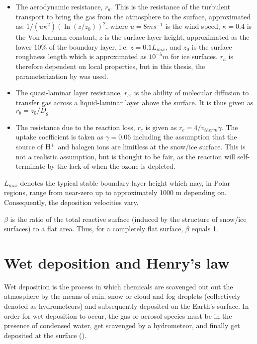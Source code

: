 \begin{itemize}
    \item The aerodynamic resistance, $r_a$. This is the resistance of the turbulent transport to bring the gas from the atmosphere to the surface, approximated as: $1/(u\kappa^2)(\ln(z/z_0))^2$, where $u = 8 ms^{-1}$ is the wind speed, $\kappa = 0.4$ is the Von Karman constant, $z$ is the surface layer height, approximated as the lower $10\%$ of the boundary layer, i.e. $z = 0.1L_{mix}$, and $z_0$ is the surface roughness length which is approximated as $10^{-5} m$ for ice surfaces. $r_a$ is therefore dependent on local properties, but in this thesis, the parameterization by \cite{CAO} was used. 
    \item The quasi-laminar layer resistance, $r_b$, is the ability of molecular diffusion to transfer gas across a liquid-laminar layer above the surface. It is thus given as $r_b = z_0/D_g$
    \item The resistance due to the reaction loss, $r_c$ is given as $r_c = 4/v_{therm}\gamma$. The uptake coefficient is taken as $\gamma = 0.06$ including the assumption that the source of $\mathrm{H^+}$ and halogen ions are limitless at the snow/ice surface. This is not a realistic assumption, but is thought to be fair, as the reaction will self-terminate by the lack of  when the ozone is depleted. 
\end{itemize}

$L_{mix}$ denotes the typical stable boundary layer height which may, in Polar regions, range from near-zero up to approximately 1000 m depending on. Consequently, the deposition velocities vary.

\medskip

$\beta$ is the ratio of the total reactive surface (induced by the structure of snow/ice surfaces) to a flat area. Thus, for a completely flat surface, $\beta$ equals 1. 





\section{Wet deposition and Henry's law}\label{sec:wet_dep_henrys_law}

Wet deposition is the process in which chemicals are scavenged out out the atmosphere by the means of rain, snow or cloud and fog droplets (collectively denoted as hydrometeors) and subsequently deposited on the Earth's surface. In order for wet deposition to occur, the gas or aerosol species must be in the presence of condensed water, get scavenged by a hydrometeor, and finally get deposited at the surface (\cite{SeinfeldSpyros}). 

